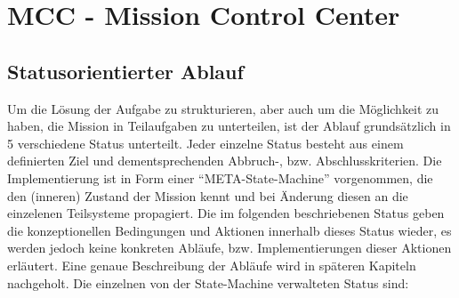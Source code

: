 \chapter{MCC - Mission Control Center}\label{MCC - Mission Control Center}

\section{Statusorientierter Ablauf}

Um die Lösung der Aufgabe zu strukturieren, aber auch um die Möglichkeit zu haben, die Mission in Teilaufgaben zu unterteilen, ist der Ablauf grundsätzlich in 5 verschiedene Status unterteilt. Jeder einzelne Status besteht aus einem definierten Ziel und dementsprechenden Abbruch-, bzw. Abschlusskriterien. Die Implementierung ist in Form einer ``META-State-Machine'' vorgenommen, die den (inneren) Zustand der Mission kennt und bei Änderung diesen an die einzelenen Teilsysteme propagiert. Die im folgenden beschriebenen Status geben die konzeptionellen Bedingungen und Aktionen innerhalb dieses Status wieder, es werden jedoch keine konkreten Abläufe, bzw. Implementierungen dieser Aktionen erläutert. Eine genaue Beschreibung der Abläufe wird in späteren Kapiteln nachgeholt. Die einzelnen von der State-Machine verwalteten Status sind:

